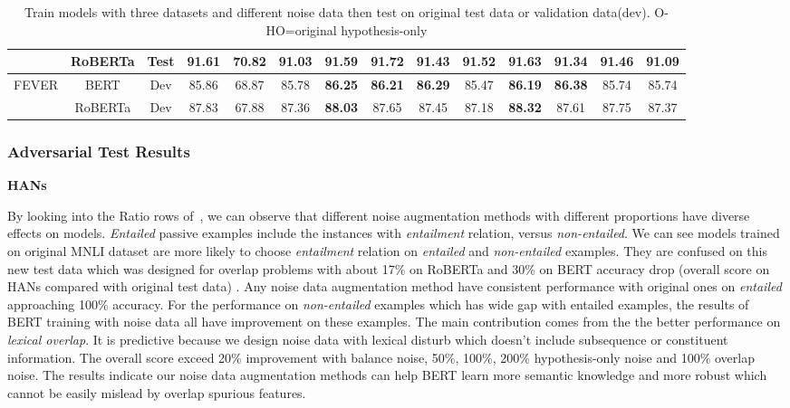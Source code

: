 \begin{table}[]
\begin{tabular}{|c|c|c|c|c|c|c|c|c|c|c|c|c|c|}
                         & RoBERTa                  & Test                       & 91.61                     & 70.82                        & 91.03                          & 91.59          & \textbf{91.72} & 91.43          & 91.52          & \textbf{91.63} & 91.34          & 91.46          & 91.09          \\ \hline
\multirow{2}{*}{FEVER}   & BERT                     & Dev                        & 85.86                     & 68.87                        & 85.78                          & \textbf{86.25} & \textbf{86.21} & \textbf{86.29} & 85.47          & \textbf{86.19} & \textbf{86.38} & 85.74          & 85.74          \\ \cline{2-14} 
                         & RoBERTa                  & Dev                        & 87.83                     & 67.88                        & 87.36                          & \textbf{88.03} & 87.65          & 87.45          & 87.18          & \textbf{88.32} & 87.61          & 87.75          & 87.37          \\ \hline
\end{tabular}
	\caption{Train models with three datasets and different noise data then test 
	on original test data or validation data(dev). O-HO=original hypothesis-only}
	\label{tab:original}
\end{table}




\subsubsection{Adversarial Test Results}

\textbf{HANs} 

By looking into the Ratio rows of~, we can observe
that different noise augmentation methods with different proportions 
have diverse effects on models.
\textit{Entailed} passive examples include the instances with \textit{entailment} 
relation, versus \textit{non-entailed}. 
We can see models trained on original MNLI dataset are more likely 
to choose \textit{entailment} relation on \textit{entailed} and \textit{non-entailed} examples. 
They are confused on this new test data which was designed for overlap problems 
with about 17\% on RoBERTa and 30\% on BERT accuracy drop 
(overall score on HANs compared with original test data) . 
Any noise data augmentation method have consistent performance with 
original ones on \textit{entailed} approaching 100\% accuracy. 
For the performance on \textit{non-entailed} examples which has wide gap 
with entailed examples, the results of BERT training with noise data all have 
improvement on these examples. The main contribution comes from the 
the better performance on \textit{lexical overlap}. It is predictive because 
we design noise data with lexical disturb which doesn't include subsequence or 
constituent information. The overall score exceed 20\% improvement with balance noise, 
50\%, 100\%, 200\%  hypothesis-only noise and 100\% overlap noise. The results indicate 
our noise data augmentation methods can help BERT learn more semantic knowledge 
and more robust which cannot be easily mislead by overlap spurious features.

